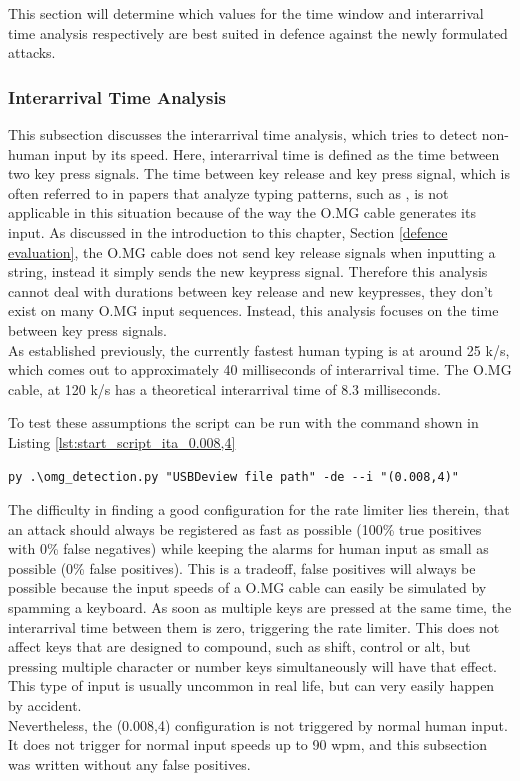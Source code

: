 This section will determine which values for the time window and interarrival time analysis respectively are best suited in defence against the newly formulated attacks.\\


\subsubsection{Interarrival Time Analysis}


This subsection discusses the interarrival time analysis, which tries to detect non-human input by its speed. Here, interarrival time is defined as the time between two key press signals. The time between key release and key press signal, which is often referred to in papers that analyze typing patterns, such as \cite{neunerUSBlockBlockingUSBBased2018}, is not applicable in this situation because of the way the O.MG cable generates its input. As discussed in the introduction to this chapter, Section \ref{defence evaluation}, the O.MG cable does not send key release signals when inputting a string, instead it simply sends the new keypress signal. Therefore this analysis cannot deal with durations between key release and new keypresses, they don't exist on many O.MG input sequences. Instead, this analysis focuses on the time between key press signals. \\
As established previously, the currently fastest human typing is at around 25 k/s, which comes out to approximately 40 milliseconds of interarrival time. The O.MG cable, at 120 k/s has a theoretical interarrival time of 8.3 milliseconds. 

To test these assumptions the script can be run with the command shown in Listing \ref{lst:start_script_ita_0.008,4}


\begin{lstlisting}[caption={start defence Script with ITA (0.008,4)},label={lst:start_script_ita_0.008,4}, captionpos=b]
 py .\omg_detection.py "USBDeview file path" -de --i "(0.008,4)"
\end{lstlisting}

The difficulty in finding a good configuration for the rate limiter lies therein, that an attack should always be registered as fast as possible (100\% true positives with 0\% false negatives) while keeping the alarms for human input as small as possible (0\% false positives).
This is a tradeoff, false positives will always be possible because the input speeds of a O.MG cable can easily be simulated by spamming a keyboard. As soon as multiple keys are pressed at the same time, the interarrival time between them is zero, triggering the rate limiter. This does not affect keys that are designed to compound, such as shift, control or alt, but pressing multiple character or number keys simultaneously will have that effect. This type of input is usually uncommon in real life, but can very easily happen by accident. \\
Nevertheless, the (0.008,4) configuration is not triggered by normal human input. It does not trigger for normal input speeds up to 90 wpm, and this subsection was written without any false positives. 


